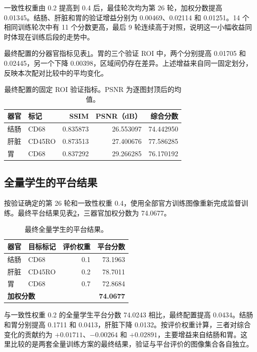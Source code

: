 \documentclass[UTF8,a4paper,zihao=5,fontset=fandol]{ctexart}
\begin{document}
一致性权重由 0.2 提高到 0.4 后，最佳轮次均为第 26 轮，加权分数提高 0.01345。结肠、肝脏和胃的验证增益分别为 0.00469、0.02114 和 0.01251。14 个相同训练轮次中有 11 个分数更高，最后 9 轮连续高于对照，说明这一小幅收益同时体现在训练后段的走势中。

最终配置的分器官指标见表\ref{tab:organval}。胃的三个验证 ROI 中，两个分别提高 0.01705 和 0.02445，另一个下降 0.00398，区域间仍存在差异。上述增益来自同一固定划分，反映本次配对比较中的平均变化。

\begin{table}[H]\centering\small
\caption{最终配置的固定 ROI 验证指标。PSNR 为逐图封顶后的均值。}\label{tab:organval}
\begin{tabular}{llrrr}\toprule
器官&标记&SSIM&PSNR（dB）&综合分数\\\midrule
结肠&CD68&0.835873&26.553097&74.442950\\
肝脏&CD45RO&0.873513&27.400676&77.586285\\
胃&CD68&0.837292&29.266285&76.170192\\\bottomrule
\end{tabular}
\end{table}

\subsection{全量学生的平台结果}
按验证确定的第 26 轮和一致性权重 0.4，使用全部官方训练图像重新完成监督训练。最终平台结果见表\ref{tab:online}，三器官加权分数为 74.0677。

\begin{table}[H]\centering\small
\caption{最终全量学生的平台结果。}\label{tab:online}
\begin{tabular}{llrr}\toprule
器官&目标标记&评价权重&平台分数\\\midrule
结肠&CD68&0.1&73.1963\\
肝脏&CD45RO&0.2&78.7011\\
胃&CD68&0.7&72.8684\\\midrule
\multicolumn{3}{l}{\textbf{加权分数}}&\textbf{74.0677}\\\bottomrule
\end{tabular}
\end{table}

与一致性权重 0.2 的全量学生平台分数 74.0243 相比，最终配置提高 0.0434。结肠和胃分别提高 0.1711 和 0.0413，肝脏下降 0.0132。按评价权重计算，三者对综合变化的贡献约为 $+0.01711$、$-0.00264$ 和 $+0.02891$，主要增益来自结肠和胃。这里比较的是两套全量训练方案的最终结果，验证与平台评价的图像集合各自独立。
\end{document}
